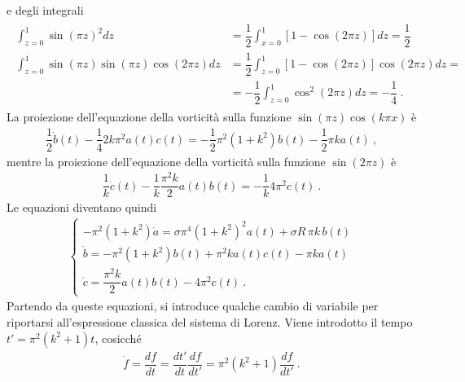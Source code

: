 \documentclass[letterpaper,10pt,italian]{jupyterBook}
\begin{document}
\sphinxAtStartPar
e degli integrali
\begin{equation*}
\begin{split}\begin{aligned}
 \int_{z=0}^{1} \sin{(\pi z)}^2 dz & = \dfrac{1}{2} \int_{x=0}^{1} \left[ 1 - \cos{(2\pi z)} \right] dz = \dfrac{1}{2} \\
 \int_{z=0}^{1} \sin{(\pi z)} \sin{(\pi z)} \cos{(2\pi z)} dz  & =
 \dfrac{1}{2} \int_{z=0}^{1} \left[ 1 - \cos{(2\pi z)} \right]  \cos{(2\pi z)} dz = \\
 & = - \dfrac{1}{2} \int_{z=0}^{1} \cos^2{(2\pi z)}  dz = 
  - \dfrac{1}{4} \ .
\end{aligned}\end{split}
\end{equation*}
\sphinxAtStartPar
La proiezione dell’equazione della vorticità sulla
funzione \(\sin{(\pi z)} \cos{(k \pi x)}\) è
\begin{equation*}
\begin{split}\dfrac{1}{2}\dot{b}(t) - \dfrac{1}{4} 2 k \pi^2 a(t) c(t) =
    -\dfrac{1}{2} \pi^2 (1+k^2) b(t) - \dfrac{1}{2}\pi k a(t) \ ,\end{split}
\end{equation*}
\sphinxAtStartPar
mentre la proiezione dell’equazione della vorticità sulla funzione
\(\sin{(2 \pi z)}\) è
\begin{equation*}
\begin{split}\dfrac{1}{k}\dot{c}(t) - \dfrac{1}{k} \dfrac{\pi^2 k}{2} a(t) b(t) =
    - \dfrac{1}{k} 4 \pi^2 c(t) \ .\end{split}
\end{equation*}
\sphinxAtStartPar
Le equazioni diventano quindi
\begin{equation*}
\begin{split}\begin{cases}
   - \pi^2 (1+k^2) \dot{a} = \sigma \pi^4 (1+k^2)^2 a(t) +  \sigma R \, \pi k \, b(t) \\
    \dot{b} = -\pi^2 (1+k^2) b(t) + \pi^2 k a(t)c(t)  - \pi k a(t)  \\
    \dot{c} = \dfrac{\pi^2 k}{2} a(t) b(t) - 4 \pi^2 c(t) \ .
\end{cases}\end{split}
\end{equation*}
\sphinxAtStartPar
Partendo da queste equazioni, si introduce qualche
cambio di variabile per riportarsi all’espressione classica del sistema
di Lorenz. Viene introdotto il tempo \(t' = \pi^2 (k^2 + 1) t\), cosicché
\begin{equation*}
\begin{split}\dot{f} = \dfrac{df}{dt} = \dfrac{dt'}{dt}\dfrac{df}{dt'} =
    \pi^2 (k^2 + 1) \dfrac{df}{dt'} \ .\end{split}
\end{equation*}
\end{document}
